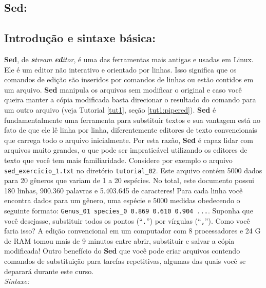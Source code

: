 \begin{refsection}

\section{Sed:}\label{tut2:sed}

\subsection{Introdução e sintaxe básica:}\label{tut2:sed:intro}

	\textbf{Sed}, de \textit{\textbf{s}tream \textbf{ed}itor}, é uma das ferramentas mais antigas e usadas em Linux. Ele é um editor não interativo e orientado por linhas. Isso significa que os comandos de edição são inseridos por comandos de linhas ou estão contidos em um arquivo. \textbf{Sed} manipula os arquivos sem modificar o original e caso você queira manter a cópia modificada basta direcionar o resultado do comando para um outro arquivo (veja Tutorial \ref{tut1}, seção \ref{tut1:pipered}). \textbf{Sed} é fundamentalmente uma ferramenta para substituir textos e sua vantagem está no fato de que ele lê linha por linha, diferentemente editores de texto convencionais que carrega todo o arquivo inicialmente. Por esta razão, \textbf{Sed} é capaz lidar com arquivos muito grandes, o que pode ser impraticável utilizando os editores de texto que você tem mais familiaridade. Considere por exemplo o arquivo \texttt{sed\_exercicio\_1.txt} no diretório \texttt{tutorial\_02}. Este arquivo contém 5000 dados para 20 gêneros que variam de 1 a 20 espécies. No total, este documento possui 180 linhas, 900.360 palavras e 5.403.645 de caracteres! Para cada linha você encontra dados para um gênero, uma espécie e 5000 medidas obedecendo o seguinte formato: \texttt{Genus\_01 species\_0	0.869	0.610	0.904	...}. Suponha que você desejasse, substituir todos os pontos (``\texttt{.}'') por vírgulas (``\texttt{,}''). Como você faria isso? A edição convencional em um computador com 8 processadores e 24 G de RAM tomou mais de 9 minutos entre abrir, substituir e salvar a cópia modificada! Outro benefício do \textbf{Sed} que você pode criar arquivos contendo comandos de substituição para tarefas repetitivas, algumas das quais você se deparará durante este curso.\\

\textit{Sintaxe:}\\
 \\


\end{refsection}

